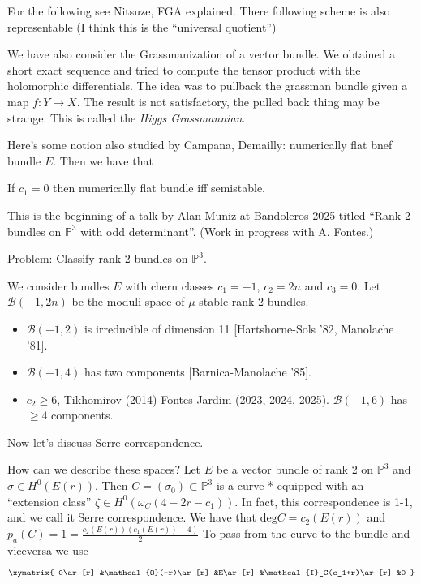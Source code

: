 \documentclass{book}
\begin{document}
For the following see Nitsuze, FGA explained.
There following scheme is also representable
(I think this is the ``universal quotient'')

We have also consider the Grassmanization of
a vector bundle.
We obtained a short exact sequence
and tried to compute the tensor product with
the holomorphic differentials.
The idea was to pullback the grassman bundle
given a map $f:Y \to X$.
The result is not satisfactory, the pulled
back
thing may be strange. This is called the
{\it Higgs Grassmannian}.


Here's some notion also studied by Campana,
Demailly:
numerically flat bnef bundle $E$.
Then we have that
\begin{lemma}
\label{lemma-proof-hugo-bruzzo}
If $c_1=0$ then numerically flat bundle iff
semistable.
\end{lemma}

\medskip\noindent
This is the beginning of a talk by Alan Muniz
at Bandoleros 2025 titled
``Rank 2-bundles on $\mathbb{P}^3$ with odd
determinant''.
(Work in progress with A. Fontes.)

Problem: Classify rank-2 bundles on
$\mathbb{P}^3$.

We consider bundles $E$ with chern classes
$c_1=-1$, $c_2=2n$ and $c_3=0$.
Let $\mathcal{B}(-1,2n)$ be the moduli space
of $\mu$-stable rank 2-bundles.

\begin{itemize}
\item $\mathcal{B}(-1,2)$ is irreducible of
dimension 11
[Hartshorne-Sols '82, Manolache '81].

\item $\mathcal{B}(-1,4)$ has two components
[Barnica-Manolache '85].

\item $c_2\geq 6$, Tikhomirov (2014)
Fontes-Jardim (2023, 2024, 2025).
$\mathcal{B}(-1,6)$ has $\geq 4$ components.
\end{itemize}

\medskip\noindent
Now let's discuss Serre correspondence.

How can we describe these spaces?
Let $E$ be a vector bundle of rank 2
on $\mathbb{P}^3$ and $\sigma \in H^0(E(r))$.
Then $C=(\sigma_0)\subset \mathbb{P}^3$ is
a curve * equipped
with an ``extension class''
$\zeta \in H^0(\omega_C(4-2r-c_1))$.
In fact, this correspondence
is 1-1, and we call it Serre correspondence.
We have that $\text{deg}C=c_2(E(r))$ and
$p_a(C)=1=\frac{c_2(E(r))(c_1(E(r))-4)}{2}$
To pass from the curve to the bundle
and viceversa we use
$$
\xymatrix{
0\ar[r]
&\mathcal{O}(-r)\ar[r]
&E\ar[r]
&\mathcal{I}_C(c_1+r)\ar[r]
&0
}
$$
\end{document}
